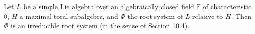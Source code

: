 Let $L$ be a simple Lie algebra over an algebraically closed field $\mathbb{F}$ of characteristic $0$, $H$ a maximal toral subalgebra, and $\Phi$ the root system of $L$ relative to $H$. Then $\Phi$ is an irreducible root system (in the sense of Section 10.4).